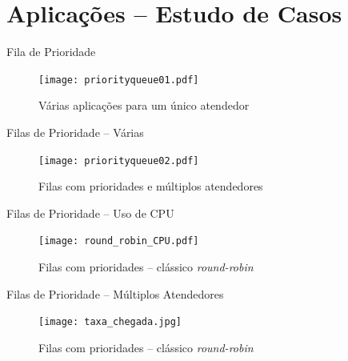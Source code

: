 \section{Aplicações -- Estudo de Casos}




\begin{frame}[c]{Fila de Prioridade} 

		   	\begin{figure}[!htpb]
				\centering
 \texttt{[image: priorityqueue01.pdf]}
\caption{Várias aplicações para um único atendedor}
			\end{figure} 
\end{frame}



\begin{frame}[c]{Filas de Prioridade -- Várias} 

		   	\begin{figure}[!htpb]
				\centering
 \texttt{[image: priorityqueue02.pdf]}
\caption{Filas com prioridades e múltiplos atendedores}
			\end{figure} 
\end{frame}



\begin{frame}[c]{Filas de Prioridade -- Uso de CPU} 

		   	\begin{figure}[!htpb]
				\centering
 \texttt{[image: round\_robin\_CPU.pdf]}
\caption{Filas com prioridades -- clássico \textit{round-robin}}
			\end{figure} 
\end{frame}




\begin{frame}[c]{Filas de Prioridade -- Múltiplos Atendedores} 

		   	\begin{figure}[!htpb]
				\centering
 \texttt{[image: taxa\_chegada.jpg]}
\caption{Filas com prioridades -- clássico \textit{round-robin}}
			\end{figure} 
\end{frame}

